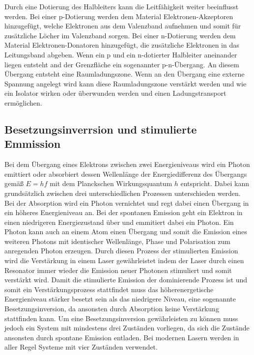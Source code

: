 Durch eine Dotierung des Halbleiters kann die Leitfähigkeit weiter beeinflusst werden. Bei einer p-Dotierung werden dem Material Elektronen-Akzeptoren hinzugefügt, welche Elektronen aus dem Valenzband aufnehmen und somit für zusätzliche Löcher im Valenzband sorgen. Bei einer n-Dotierung werden dem Material Elektronen-Donatoren hinzugefügt, die zusätzliche Elektronen in das Leitungsband abgeben. Wenn ein p und ein n-dotierter Halbleiter aneinander liegen entsteht and der Grenzfläche ein sogenannter p-n-Übergang. An diesem Übergang entsteht eine Raumladungszone. Wenn an den Übergang eine externe Spannung angelegt wird kann diese Raumladungszone verstärkt werden und wie ein Isolator wirken oder überwunden werden und einen Ladungstransport ermöglichen.
\subsection{Besetzungsinverrsion und stimulierte Emmission}
Bei dem Übergang eines Elektrons zwischen zwei Energieniveaus wird ein Photon emittiert oder absorbiert dessen Wellenlänge der Energiedifferenz des Übergangs gemäß $E=hf$ mit dem Planckschen Wirkungsquantum $h$ entspricht.
Dabei kann grundsätzlich zwischen drei unterschiedlichen Prozessen unterschieden werden. Bei der Absorption wird ein Photon vernichtet und regt dabei einen Übergang in ein höheres Energieniveau an. Bei der spontanen Emission geht ein Elektron in einen niedrigeren Energiezustand über und emmitiert dabei ein Photon.
Ein Photon kann auch an einem Atom einen Übergang und somit die Emission eines weiteren Photons mit identischer Wellenlänge, Phase und Polarisation zum anregenden Photon erzeugen. Durch diesen Prozess der stimulierten Emission wird die Verstärkung in einem Laser gewährleistet indem der Laser durch einen Resonator immer wieder die Emission neuer Photonen stimuliert und somit verstärkt wird. Damit die stimulierte Emission der dominierende Prozess ist und somit ein Verstärkungsprozess stattfindet muss das höherenergetische Energieniveau stärker besetzt sein als das niedrigere Niveau, eine sogenannte Besetzungsinversion, da ansonsten durch Absorption keine Verstärkung stattfinden kann. Um eine Besetzungsinversion gewährleisten zu können muss jedoch ein System mit mindestens drei Zuständen vorliegen, da sich die Zustände ansonsten durch spontane Emission entladen. Bei modernen Lasern werden in aller Regel Systeme mit vier Zuständen verwendet. 
